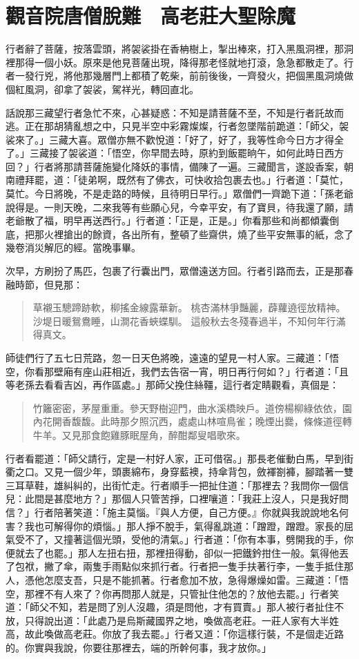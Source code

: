 
\chapter{觀音院唐僧脫難　高老莊大聖除魔}

行者辭了菩薩，按落雲頭，將袈裟掛在香柟樹上，掣出棒來，打入黑風洞裡，那洞裡那得一個小妖。原來是他見菩薩出現，降得那老怪就地打滾，急急都散走了。行者一發行兇，將他那幾層門上都積了乾柴，前前後後，一齊發火，把個黑風洞燒做個紅風洞，卻拿了袈裟，駕祥光，轉回直北。

話說那三藏望行者急忙不來，心甚疑惑：不知是請菩薩不至，不知是行者託故而逃。正在那胡猜亂想之中，只見半空中彩霧燦燦，行者忽墜階前跪道：「師父，袈裟來了。」三藏大喜。眾僧亦無不歡悅道：「好了，好了，我等性命今日方才得全了。」三藏接了袈裟道：「悟空，你早間去時，原約到飯罷晌午，如何此時日西方回？」行者將那請菩薩施變化降妖的事情，備陳了一遍。三藏聞言，遂設香案，朝南禮拜罷，道：「徒弟啊，既然有了佛衣，可快收拾包裹去也。」行者道：「莫忙，莫忙。今日將晚，不是走路的時候，且待明日早行。」眾僧們一齊跪下道：「孫老爺說得是。一則天晚，二來我等有些願心兒，今幸平安，有了寶貝，待我還了願，請老爺散了福，明早再送西行。」行者道：「正是，正是。」你看那些和尚都傾囊倒底，把那火裡搶出的餘資，各出所有，整頓了些齋供，燒了些平安無事的紙，念了幾卷消災解厄的經。當晚事畢。

次早，方刷扮了馬匹，包裹了行囊出門，眾僧遠送方回。行者引路而去，正是那春融時節，但見那：
\begin{quote}
草襯玉驄蹄跡軟，柳搖金線露華新。
桃杏滿林爭豔麗，薜蘿遶徑放精神。
沙堤日暖鴛鴦睡，山澗花香蛺蝶馴。
這般秋去冬殘春過半，不知何年行滿得真文。
\end{quote}

師徒們行了五七日荒路，忽一日天色將晚，遠遠的望見一村人家。三藏道：「悟空，你看那壁廂有座山莊相近，我們去告宿一宵，明日再行何如？」行者道：「且等老孫去看看吉凶，再作區處。」那師父挽住絲韁，這行者定睛觀看，真個是：
\begin{quote}
竹籬密密，茅屋重重。參天野樹迎門，曲水溪橋映戶。道傍楊柳綠依依，園內花開香馥馥。此時那夕照沉西，處處山林喧鳥雀；晚煙出爨，條條道徑轉牛羊。又見那食飽雞豚眠屋角，醉酣鄰叟唱歌來。
\end{quote}

行者看罷道：「師父請行，定是一村好人家，正可借宿。」那長老催動白馬，早到街衢之口。又見一個少年，頭裹綿布，身穿藍襖，持傘背包，斂褌劄褲，腳踏著一雙三耳草鞋，雄糾糾的，出街忙走。行者順手一把扯住道：「那裡去？我問你一個信兒：此間是甚麼地方？」那個人只管苦掙，口裡嚷道：「我莊上沒人，只是我好問信？」行者陪著笑道：「施主莫惱。『與人方便，自己方便。』你就與我說說地名何害？我也可解得你的煩惱。」那人掙不脫手，氣得亂跳道：「蹭蹬，蹭蹬。家長的屈氣受不了，又撞著這個光頭，受他的清氣。」行者道：「你有本事，劈開我的手，你便就去了也罷。」那人左扭右扭，那裡扭得動，卻似一把鐵鈐拑住一般。氣得他丟了包袱，撇了傘，兩隻手雨點似來抓行者。行者把一隻手扶著行李，一隻手抵住那人，憑他怎麼支吾，只是不能抓著。行者愈加不放，急得爆燥如雷。三藏道：「悟空，那裡不有人來了？你再問那人就是，只管扯住他怎的？放他去罷。」行者笑道：「師父不知，若是問了別人沒趣，須是問他，才有買賣。」那人被行者扯住不放，只得說出道：「此處乃是烏斯藏國界之地，喚做高老莊。一莊人家有大半姓高，故此喚做高老莊。你放了我去罷。」行者又道：「你這樣行裝，不是個走近路的。你實與我說，你要往那裡去，端的所幹何事，我才放你。」

